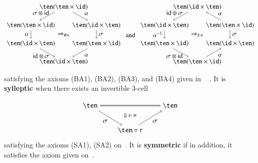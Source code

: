 \documentclass{amsart}
\begin{document}
\begin{defn}
\begin{equation}
  \begin{aligned}
\begin{tikzpicture}[xscale=0.9]
\node (t) at (2,3) {$\ten (\ten \times \id)$};
\node (tl) at (0,2) {$\ten(\ten \times \id)$};
\node (bl) at (0,1) {$\ten (\id \times \ten)$};
\node (b) at (2,0) {$\ten (\id \times \ten)$};
\node (tr) at (4,2) {$\ten(\id \times \ten)$};
\node (br) at (4,1) {$\ten (\ten \times \id)$};
\draw[->] (t) to node [above,xshift=10pt, yshift=-2] {$\alpha$} (tr);
\draw[->] (tr) to node [right] {$\sigma$} (br);
\draw[->] (br) to node [below,xshift=10pt, yshift=2pt] {$\alpha$} (b);
\draw[->] (t) to node [above,xshift=-10pt, yshift=-2pt] {$\sigma \otimes \mbox{id}$} (tl);
\draw[->] (tl) to node [left] {$\alpha$} (bl);
\draw[->] (bl) to node [below,xshift=-10pt,yshift=2pt] {$\mathid \otimes \sigma$} (b);
\node at (2,1.5) {$\Rightarrow_{R \iso}$};
\end{tikzpicture}
  \end{aligned}
\hspace{5pt}\mbox{and} \hspace{5pt}
\begin{aligned}
\begin{tikzpicture}[xscale=0.9]
\node (t) at (2,3) {$\ten(\id \times \ten)$};
\node (tl) at (0,2) {$\ten(\id \times \ten)$};
\node (bl) at (0,1) {$\ten(\ten \times \id)$};
\node (b) at (2,0) {$\ten(\ten \times \id)$};
\node (tr) at (4,2) {$\ten(\ten \times \id)$};
\node (br) at (4,1) {$\ten(\id \times \ten)$};
\draw[->] (tr) to node [above,xshift=10pt, yshift=-2] {$\alpha$} (t);
\draw[->] (tr) to node [right] {$\sigma$} (br);
\draw[->] (b) to node [below,xshift=10pt, yshift=2pt] {$\alpha$} (br);
\draw[->] (t) to node [above,xshift=-10pt, yshift=-2pt] {$\mbox{id} \otimes \sigma$} (tl);
\draw[->] (tl) to node [left] {${\alpha}^{-1}$} (bl);
\draw[->] (bl) to node [below,xshift=-10pt,yshift=2pt] {$\sigma \otimes \mathid$} (b);
\node at (2,1.5) {$\Rightarrow_{S \iso}$};
\end{tikzpicture}
\end{aligned}
\end{equation}
satisfying the axioms (BA1), (BA2), (BA3), and (BA4) given in ~\cite[p136--139]{mccrudden:bal-coalgb} . 
It is {\bf sylleptic} when there exists an invertible 3-cell

 \[
 \begin{tikzpicture}
 \node (tl) at (-2,1) {$\ten$};
 \node (tr) at (2,1) {$\ten$};
 \node (b) at (0,-.25) {$\ten \circ \tau$};
 \draw[double] (tl)  -- (tr);
 \draw[->] (tl) to node[left, yshift=-5pt]{$\sigma$} (b);
 \draw[->] (b) to node[right, yshift=-5pt] {$\sigma$}(tr);
 \node at (0,0.5) {\footnotesize $\Downarrow \upsilon \iso$}; 
 \end{tikzpicture}
 \]
  satisfying the axioms (SA1), (SA2) on~\cite[p144--145]{mccrudden:bal-coalgb}. It is {\bf symmetric} if in addition, it satisfies the axiom given on~\cite[p91]{mccrudden:bal-coalgb}.
\end{defn}
\end{document}
